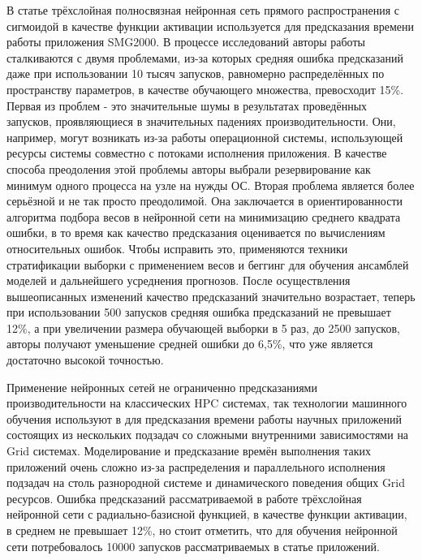 		В статье \cite{ML_SMG2000} трёхслойная полносвязная нейронная сеть прямого распространения с сигмоидой в качестве функции активации используется для предсказания времени работы приложения SMG2000. В процессе исследований авторы работы сталкиваются с двумя проблемами, из-за которых средняя ошибка предсказаний даже при использовании 10 тысяч запусков, равномерно распределённых по пространству параметров, в качестве обучающего множества, превосходит 15\%. Первая из проблем - это значительные шумы в результатах проведённых запусков, проявляющиеся в значительных падениях производительности. Они, например, могут возникать из-за работы операционной системы, использующей ресурсы системы совместно с потоками исполнения приложения. В качестве способа преодоления этой проблемы авторы выбрали резервирование как минимум одного процесса на узле на нужды ОС. Вторая проблема является более серьёзной и не так просто преодолимой. Она заключается в ориентированности алгоритма подбора весов в нейронной сети на минимизацию среднего квадрата ошибки, в то время как качество предсказания оценивается по вычислениям относительных ошибок. Чтобы исправить это, применяются техники стратификации выборки с применением весов и беггинг для обучения ансамблей моделей и дальнейшего усреднения прогнозов. После осуществления вышеописанных изменений качество предсказаний значительно возрастает, теперь при использовании 500 запусков средняя ошибка предсказаний не превышает 12\%, а при увеличении размера обучающей выборки в 5 раз, до 2500 запусков, авторы получают уменьшение средней ошибки до 6,5\%, что уже является достаточно высокой точностью.

		Применение нейронных сетей не ограниченно предсказаниями производительности на классических HPC системах, так технологии машинного обучения используют в \cite{ML_Grid} для предсказания времени работы научных приложений состоящих из нескольких подзадач со сложными внутренними зависимостями на Grid системах. Моделирование и предсказание времён выполнения таких приложений очень сложно из-за распределения и параллельного исполнения подзадач на столь разнородной системе и динамического поведения общих Grid ресурсов. Ошибка предсказаний рассматриваемой в работе трёхслойная нейронной сети с радиально-базисной функцией, в качестве функции активации, в среднем не превышает 12\%, но стоит отметить, что для обучения нейронной сети потребовалось 10000 запусков рассматриваемых в статье приложений.

